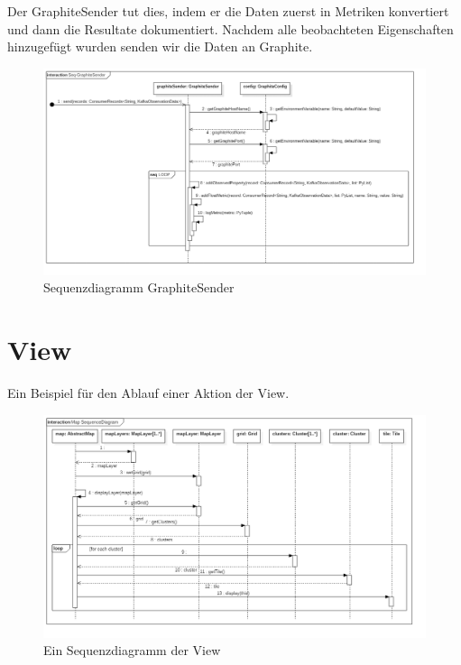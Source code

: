 Der GraphiteSender tut dies, indem er die Daten zuerst in Metriken konvertiert und dann die Resultate dokumentiert.
Nachdem alle beobachteten Eigenschaften hinzugefügt wurden senden wir die Daten an Graphite.
\begin{figure}[!hbp]
	\centering
	\includegraphics[width=\linewidth]{images/graphite/GraphiteSenderSequenceDiagram.png}
	\caption{Sequenzdiagramm GraphiteSender}
\end{figure}
\newpage

\section{View}
Ein Beispiel für den Ablauf einer Aktion der View.
\begin{figure}[!hbp]
	\centering
	\includegraphics[width=\linewidth]{images/view/ViewSequenceDiagram.png}
	\caption{Ein Sequenzdiagramm der View}
\end{figure}
\newpage

